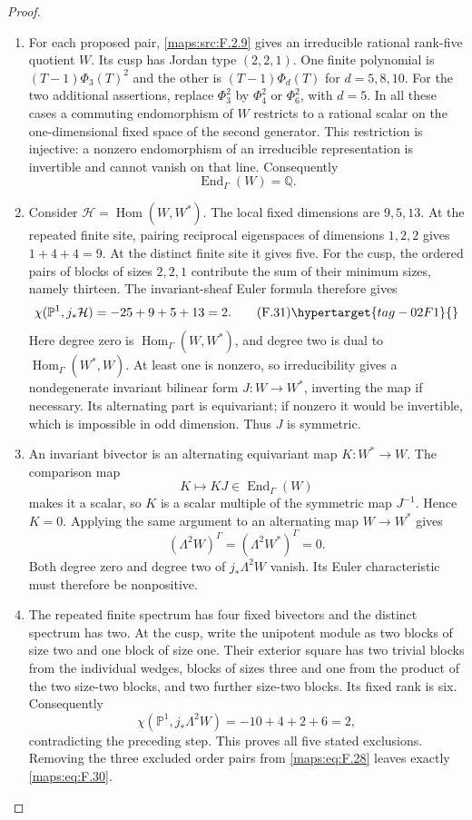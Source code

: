 \begin{proof}
\begin{enumerate}[label={$\langle1\rangle$\arabic*.}]
\item For each proposed pair, \ref{maps:src:F.2.9} gives an
irreducible rational rank-five quotient $W$.  Its cusp has Jordan
type $(2,2,1)$.  One finite polynomial is
$(T-1)\Phi_3(T)^2$ and the other is $(T-1)\Phi_d(T)$ for
$d=5,8,10$.  For the two additional assertions, replace
$\Phi_3^2$ by $\Phi_4^2$ or $\Phi_6^2$, with $d=5$.
In all these cases a commuting endomorphism of $W$ restricts to a
rational scalar on the one-dimensional fixed space of the second
generator.  This restriction is injective: a nonzero endomorphism
of an irreducible representation is invertible and cannot vanish
on that line.  Consequently
\[
 \operatorname{End}_{\Gamma}(W)=\mathbb Q.
\]

\item Consider $\mathcal H=\operatorname{Hom}(W,W^*)$.
The local fixed dimensions are $9,5,13$.  At the repeated finite
site, pairing reciprocal eigenspaces of dimensions $1,2,2$ gives
$1+4+4=9$.  At the distinct finite site it gives five.
For the cusp, the ordered pairs of blocks of sizes $2,2,1$
contribute the sum of their minimum sizes, namely thirteen.
The invariant-sheaf Euler formula therefore gives
\[
 \chi(\mathbb P^1,j_*\mathcal H)=-25+9+5+13=2.
 \tag{F.31}\hypertarget{tag-02F1}{}\label{maps:eq:F.31}
\]
Here degree zero is $\operatorname{Hom}_{\Gamma}(W,W^*)$,
and degree two is dual to
$\operatorname{Hom}_{\Gamma}(W^*,W)$.  At least one is nonzero,
so irreducibility gives a nondegenerate invariant bilinear form
$J:W\longrightarrow W^*$, inverting the map if necessary.
Its alternating part is equivariant; if nonzero it would be
invertible, which is impossible in odd dimension.  Thus $J$ is
symmetric.

\item An invariant bivector is an alternating equivariant map
$K:W^*\longrightarrow W$.  The comparison map
\[
 K\longmapsto KJ\in\operatorname{End}_{\Gamma}(W)
\]
makes it a scalar, so $K$ is a scalar multiple of the symmetric
map $J^{-1}$.  Hence $K=0$.  Applying the same argument to an
alternating map $W\longrightarrow W^*$ gives
\[
 (\Lambda^2W)^\Gamma=(\Lambda^2W^*)^\Gamma=0.
\]
Both degree zero and degree two of $j_*\Lambda^2W$ vanish.
Its Euler characteristic must therefore be nonpositive.

\item The repeated finite spectrum has four fixed bivectors and
the distinct spectrum has two.  At the cusp, write the unipotent
module as two blocks of size two and one block of size one.
Their exterior square has two trivial blocks from the individual
wedges, blocks of sizes three and one from the product of the
two size-two blocks, and two further size-two blocks.  Its fixed
rank is six.  Consequently
\[
 \chi(\mathbb P^1,j_*\Lambda^2W)=-10+4+2+6=2,
\]
contradicting the preceding step.  This proves all five stated
exclusions.  Removing the three excluded order pairs from
\eqref{maps:eq:F.28} leaves exactly \eqref{maps:eq:F.30}.
\end{enumerate}
\end{proof}





